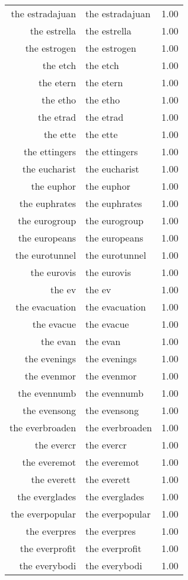 \begin{table}[ht]
\begin{tabular}{rlr}
  the estradajuan & the estradajuan & 1.00 \\ 
  the estrella & the estrella & 1.00 \\ 
  the estrogen & the estrogen & 1.00 \\ 
  the etch & the etch & 1.00 \\ 
  the etern & the etern & 1.00 \\ 
  the etho & the etho & 1.00 \\ 
  the etrad & the etrad & 1.00 \\ 
  the ette & the ette & 1.00 \\ 
  the ettingers & the ettingers & 1.00 \\ 
  the eucharist & the eucharist & 1.00 \\ 
  the euphor & the euphor & 1.00 \\ 
  the euphrates & the euphrates & 1.00 \\ 
  the eurogroup & the eurogroup & 1.00 \\ 
  the europeans & the europeans & 1.00 \\ 
  the eurotunnel & the eurotunnel & 1.00 \\ 
  the eurovis & the eurovis & 1.00 \\ 
  the ev & the ev & 1.00 \\ 
  the evacuation & the evacuation & 1.00 \\ 
  the evacue & the evacue & 1.00 \\ 
  the evan & the evan & 1.00 \\ 
  the evenings & the evenings & 1.00 \\ 
  the evenmor & the evenmor & 1.00 \\ 
  the evennumb & the evennumb & 1.00 \\ 
  the evensong & the evensong & 1.00 \\ 
  the everbroaden & the everbroaden & 1.00 \\ 
  the evercr & the evercr & 1.00 \\ 
  the everemot & the everemot & 1.00 \\ 
  the everett & the everett & 1.00 \\ 
  the everglades & the everglades & 1.00 \\ 
  the everpopular & the everpopular & 1.00 \\ 
  the everpres & the everpres & 1.00 \\ 
  the everprofit & the everprofit & 1.00 \\ 
  the everybodi & the everybodi & 1.00 \\ 

\end{tabular}
\end{table}
